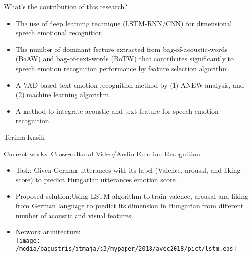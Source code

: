 \documentclass[aspectratio=169]{beamer}
\begin{document}
\begin{frame}[t, fragile]{What's the contribution of this research?}
\begin{itemize}
	\item The use of deep learning technique (LSTM-RNN/CNN) for dimensional 
	      speech emotional recognition.
	\item The number of dominant feature extracted from bag-of-acoustic-words
	      (BoAW) and bag-of-text-words (BoTW) that contributes significantly to 
	      speech emotion recognition
	      performance by feature selection algorithm.
	\item A VAD-based text emotion recognition method by (1) ANEW analysis,  and (2) 
	      machine learning algorithm. 
	\item A method to integrate acoustic and text feature for speech emotion 
	      recognition.
\end{itemize}
\end{frame}

\begin{frame}[t, fragile]
\vspace{60pt}
\begin{center}
\LARGE{Terima Kasih}
\end{center}
\end{frame}

\begin{frame}[t, fragile]{Current works: Cross-cultural Video/Audio 
Emotion Recognition}
\begin{itemize}
\item Task: Given German utterances with its label (Valence, arousal, and liking score) 
            to predict Hungarian utterances emotion score.
\item Proposed solution:Using LSTM algorithm to train valence, arousal and liking 
      from German language to predict its dimension in Hungarian from different 
      number of acoustic and visual features.
\item Network architecture:\\
\texttt{[image: /media/bagustris/atmaja/s3/mypaper/2018/avec2018/pict/lstm.eps]}
\end{itemize}
\end{frame}
\end{document}
